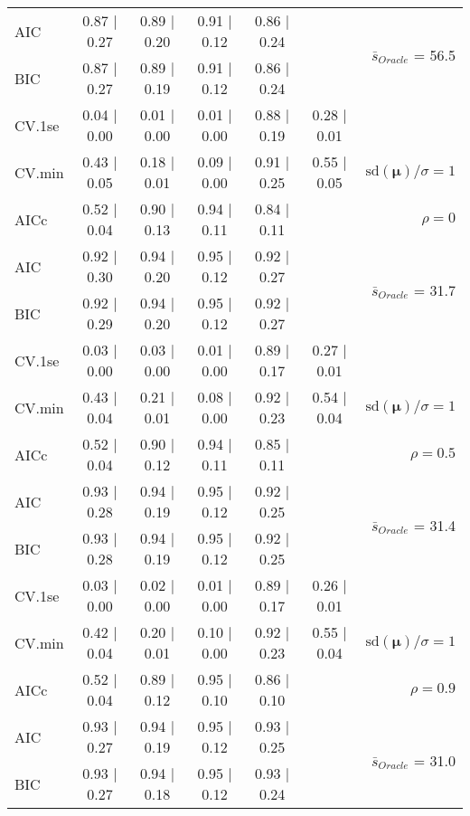 \begin{table}
\begin{center}
\begin{tabular}{l*{5}{c}|r}
AIC & 0.87 $\mid$ 0.27 & 0.89 $\mid$ 0.20 & 0.91 $\mid$ 0.12 & 0.86 $\mid$ 0.24 & &  \multirow{2}{*}{$\bar{s}_{Oracle}$ = 56.5} \\
BIC & 0.87 $\mid$ 0.27 & 0.89 $\mid$ 0.19 & 0.91 $\mid$ 0.12 & 0.86 $\mid$ 0.24 & &  \\
 \hline 
CV.1se & 0.04 $\mid$ 0.00 & 0.01 $\mid$ 0.00 & 0.01 $\mid$ 0.00 & 0.88 $\mid$ 0.19 & 0.28 $\mid$ 0.01 & \\
CV.min & 0.43 $\mid$ 0.05 & 0.18 $\mid$ 0.01 & 0.09 $\mid$ 0.00 & 0.91 $\mid$ 0.25 & 0.55 $\mid$ 0.05 &  $\mathrm{sd}(\mathbf{\mu})/\sigma=1$ \\
AICc & 0.52 $\mid$ 0.04 & 0.90 $\mid$ 0.13 & 0.94 $\mid$ 0.11 & 0.84 $\mid$ 0.11 & & $\rho=0$ \\
AIC & 0.92 $\mid$ 0.30 & 0.94 $\mid$ 0.20 & 0.95 $\mid$ 0.12 & 0.92 $\mid$ 0.27 & &  \multirow{2}{*}{$\bar{s}_{Oracle}$ = 31.7} \\
BIC & 0.92 $\mid$ 0.29 & 0.94 $\mid$ 0.20 & 0.95 $\mid$ 0.12 & 0.92 $\mid$ 0.27 & &  \\
 \hline 
CV.1se & 0.03 $\mid$ 0.00 & 0.03 $\mid$ 0.00 & 0.01 $\mid$ 0.00 & 0.89 $\mid$ 0.17 & 0.27 $\mid$ 0.01 & \\
CV.min & 0.43 $\mid$ 0.04 & 0.21 $\mid$ 0.01 & 0.08 $\mid$ 0.00 & 0.92 $\mid$ 0.23 & 0.54 $\mid$ 0.04 &  $\mathrm{sd}(\mathbf{\mu})/\sigma=1$ \\
AICc & 0.52 $\mid$ 0.04 & 0.90 $\mid$ 0.12 & 0.94 $\mid$ 0.11 & 0.85 $\mid$ 0.11 & & $\rho=0.5$ \\
AIC & 0.93 $\mid$ 0.28 & 0.94 $\mid$ 0.19 & 0.95 $\mid$ 0.12 & 0.92 $\mid$ 0.25 & &  \multirow{2}{*}{$\bar{s}_{Oracle}$ = 31.4} \\
BIC & 0.93 $\mid$ 0.28 & 0.94 $\mid$ 0.19 & 0.95 $\mid$ 0.12 & 0.92 $\mid$ 0.25 & &  \\
 \hline 
CV.1se & 0.03 $\mid$ 0.00 & 0.02 $\mid$ 0.00 & 0.01 $\mid$ 0.00 & 0.89 $\mid$ 0.17 & 0.26 $\mid$ 0.01 & \\
CV.min & 0.42 $\mid$ 0.04 & 0.20 $\mid$ 0.01 & 0.10 $\mid$ 0.00 & 0.92 $\mid$ 0.23 & 0.55 $\mid$ 0.04 &  $\mathrm{sd}(\mathbf{\mu})/\sigma=1$ \\
AICc & 0.52 $\mid$ 0.04 & 0.89 $\mid$ 0.12 & 0.95 $\mid$ 0.10 & 0.86 $\mid$ 0.10 & & $\rho=0.9$ \\
AIC & 0.93 $\mid$ 0.27 & 0.94 $\mid$ 0.19 & 0.95 $\mid$ 0.12 & 0.93 $\mid$ 0.25 & &  \multirow{2}{*}{$\bar{s}_{Oracle}$ = 31.0} \\
BIC & 0.93 $\mid$ 0.27 & 0.94 $\mid$ 0.18 & 0.95 $\mid$ 0.12 & 0.93 $\mid$ 0.24 & &  \\

\end{tabular}
\end{center}
\end{table}
